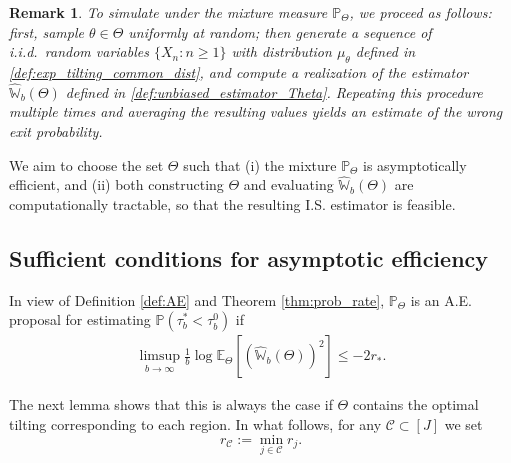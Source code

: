 \documentclass[aap,preprint]{imsart}
\newcommand{\Pro}{{\mathbb{P}}}
\newcommand{\Exp}{{\mathbb{E}}}
\theoremstyle{plain}
\newtheorem{remark}{Remark}[section]
\theoremstyle{definition}
\begin{document}




\begin{remark}\label{remark:simulation strategy}
 To simulate under the mixture measure $\Pro_{\Theta}$, we proceed as follows: first, sample $\theta \in \Theta$ uniformly at random; then generate a sequence of i.i.d.\ random variables $\{X_n : n \geq 1\}$ with distribution $\mu_{\theta}$ defined in \eqref{def:exp_tilting_common_dist}, and compute a realization of the estimator $\widehat{\mathbb{W}}_b(\Theta)$ defined in \eqref{def:unbiased_estimator_Theta}. Repeating this procedure multiple times and averaging the resulting values yields an estimate of the wrong exit probability.
\end{remark}  

We aim to choose the set $\Theta$ such that (i) the mixture $\Pro_\Theta$ is asymptotically efficient, and (ii) both constructing $\Theta$ and evaluating $\widehat{\mathbb{W}}_{b}(\Theta)$ are computationally tractable, so that the resulting I.S. estimator is feasible. 

\subsection{Sufficient conditions for asymptotic efficiency}
In view of Definition  \ref{def:AE} and Theorem \ref{thm:prob_rate}, $\Pro_{\Theta}$ is an A.E. proposal for estimating $\Pro(\tau_b^* < \tau_b^0)$ if
 \begin{align} \label{control_var}
        \limsup_{b\to \infty} \frac{1}{b} \log  \Exp_{\Theta}\left[ \left(\widehat{\mathbb{W}}_{b}(\Theta) \right)^2 \right] \leq  -2  r_*.
\end{align}

The next lemma shows that this is always the case if  $\Theta$ contains the optimal tilting corresponding to each region. In what follows, for any
$\mathcal{C} \subset [J]$ we set  
\begin{equation}
    \label{def:r_C}
    r_{\mathcal{C}} := \min_{j \in \mathcal{C}} r_j.
\end{equation}
\end{document}
